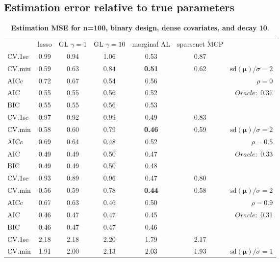 \clearpage

\subsection{Estimation error relative to true parameters}



\begin{table}\vspace{-.5cm}
\caption[l]{ { \bf Estimation MSE for n=100, binary design, 
dense covariates, and  decay  10}.}
\vspace{-.5cm}
\footnotesize{}
\begin{center}
\begin{tabular}{l*{5}{c}|r}
& lasso & GL $\gamma=1$ & GL $\gamma=10$ & marginal AL & sparsenet MCP  & \\
 \cline{1-7}
CV.1se & 0.99 & 0.94 & 1.06 & 0.53 & 0.87 & \\
CV.min & 0.59 & 0.63 & 0.84 & {\bf 0.51} & 0.62 &  $\mathrm{sd}(\mathbf{\mu})/\sigma=2$ \\
AICc & 0.72 & 0.67 & 0.54 & 0.56 & & $\rho=0$ \\
AIC & 0.55 & 0.55 & 0.56 & 0.52 & &  \multirow{2}{*}{$Oracle: $ 0.37} \\
BIC & 0.55 & 0.55 & 0.56 & 0.53 & &  \\
 \hline 
CV.1se & 0.97 & 0.92 & 0.99 & 0.49 & 0.83 & \\
CV.min & 0.58 & 0.60 & 0.79 & {\bf 0.46} & 0.59 &  $\mathrm{sd}(\mathbf{\mu})/\sigma=2$ \\
AICc & 0.69 & 0.64 & 0.48 & 0.52 & & $\rho=0.5$ \\
AIC & 0.49 & 0.49 & 0.50 & 0.47 & &  \multirow{2}{*}{$Oracle: $ 0.33} \\
BIC & 0.49 & 0.49 & 0.50 & 0.48 & &  \\
 \hline 
CV.1se & 0.93 & 0.89 & 0.96 & 0.47 & 0.80 & \\
CV.min & 0.56 & 0.59 & 0.78 & {\bf 0.44} & 0.58 &  $\mathrm{sd}(\mathbf{\mu})/\sigma=2$ \\
AICc & 0.67 & 0.63 & 0.46 & 0.50 & & $\rho=0.9$ \\
AIC & 0.46 & 0.47 & 0.47 & 0.45 & &  \multirow{2}{*}{$Oracle: $ 0.31} \\
BIC & 0.46 & 0.47 & 0.47 & 0.46 & &  \\
 \hline 
CV.1se & 2.18 & 2.18 & 2.20 & 1.79 & 2.17 & \\
CV.min & 1.91 & 2.00 & 2.13 & 2.03 & 1.93 &  $\mathrm{sd}(\mathbf{\mu})/\sigma=1$ \\

\end{tabular}
\end{center}
\end{table}
